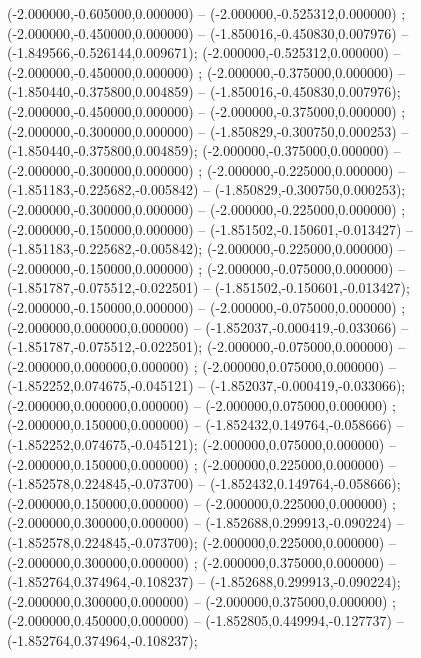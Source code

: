  (-2.000000,-0.605000,0.000000) -- (-2.000000,-0.525312,0.000000) ;
 (-2.000000,-0.450000,0.000000) -- (-1.850016,-0.450830,0.007976) -- (-1.849566,-0.526144,0.009671);
 (-2.000000,-0.525312,0.000000) -- (-2.000000,-0.450000,0.000000) ;
 (-2.000000,-0.375000,0.000000) -- (-1.850440,-0.375800,0.004859) -- (-1.850016,-0.450830,0.007976);
 (-2.000000,-0.450000,0.000000) -- (-2.000000,-0.375000,0.000000) ;
 (-2.000000,-0.300000,0.000000) -- (-1.850829,-0.300750,0.000253) -- (-1.850440,-0.375800,0.004859);
 (-2.000000,-0.375000,0.000000) -- (-2.000000,-0.300000,0.000000) ;
 (-2.000000,-0.225000,0.000000) -- (-1.851183,-0.225682,-0.005842) -- (-1.850829,-0.300750,0.000253);
 (-2.000000,-0.300000,0.000000) -- (-2.000000,-0.225000,0.000000) ;
 (-2.000000,-0.150000,0.000000) -- (-1.851502,-0.150601,-0.013427) -- (-1.851183,-0.225682,-0.005842);
 (-2.000000,-0.225000,0.000000) -- (-2.000000,-0.150000,0.000000) ;
 (-2.000000,-0.075000,0.000000) -- (-1.851787,-0.075512,-0.022501) -- (-1.851502,-0.150601,-0.013427);
 (-2.000000,-0.150000,0.000000) -- (-2.000000,-0.075000,0.000000) ;
 (-2.000000,0.000000,0.000000) -- (-1.852037,-0.000419,-0.033066) -- (-1.851787,-0.075512,-0.022501);
 (-2.000000,-0.075000,0.000000) -- (-2.000000,0.000000,0.000000) ;
 (-2.000000,0.075000,0.000000) -- (-1.852252,0.074675,-0.045121) -- (-1.852037,-0.000419,-0.033066);
 (-2.000000,0.000000,0.000000) -- (-2.000000,0.075000,0.000000) ;
 (-2.000000,0.150000,0.000000) -- (-1.852432,0.149764,-0.058666) -- (-1.852252,0.074675,-0.045121);
 (-2.000000,0.075000,0.000000) -- (-2.000000,0.150000,0.000000) ;
 (-2.000000,0.225000,0.000000) -- (-1.852578,0.224845,-0.073700) -- (-1.852432,0.149764,-0.058666);
 (-2.000000,0.150000,0.000000) -- (-2.000000,0.225000,0.000000) ;
 (-2.000000,0.300000,0.000000) -- (-1.852688,0.299913,-0.090224) -- (-1.852578,0.224845,-0.073700);
 (-2.000000,0.225000,0.000000) -- (-2.000000,0.300000,0.000000) ;
 (-2.000000,0.375000,0.000000) -- (-1.852764,0.374964,-0.108237) -- (-1.852688,0.299913,-0.090224);
 (-2.000000,0.300000,0.000000) -- (-2.000000,0.375000,0.000000) ;
 (-2.000000,0.450000,0.000000) -- (-1.852805,0.449994,-0.127737) -- (-1.852764,0.374964,-0.108237);
